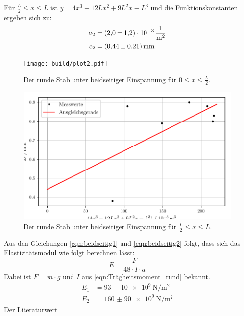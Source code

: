 Für $\frac{L}{2} \leq x \leq L$ ist $y = 4x^3 -12Lx^2 + 9L^2x -L^3$ und die Funktionskonstanten ergeben sich zu:
\begin{align*}
  a_2 &= \SI{2.0(12)e-3}{\per\metre\squared}\\
  c_2 &= \SI{0.44 \pm 0.21}{\milli\meter}\\
\end{align*}
\begin{figure}
  \caption{Der runde Stab unter beidseitiger Einspannung für $0 \leq x \leq \frac{L}{2}$.}
  \texttt{[image: build/plot2.pdf]}
\end{figure}
\begin{figure}
  \centering
  \includegraphics[width= \textwidth]{plot22.pdf}
  \caption{Der runde Stab unter beidseitiger Einspannung für $\frac{L}{2} \leq x \leq L$.}
  \label{fig:rund_beid2}
\end{figure}
Aus den Gleichungen \eqref{eqn:beidseitig1} und \eqref{eqn:beidseitig2} folgt, dass sich das Elastizitätsmodul wie folgt berechnen lässt:
\begin{equation*}
  E = \frac{F}{48 \cdot I \cdot a}
\end{equation*}
Dabei ist $F = m\cdot g$ und $I$ aus \eqref{eqn:Trägheitsmoment_rund} bekannt.
\begin{align*}
  E_1 &= \SI{93(10)e9}{\newton\per\metre\squared}\\
  E_2 &= \SI{160(90)e9}{\newton\per\metre\squared}
\end{align*}
Der Literaturwert
